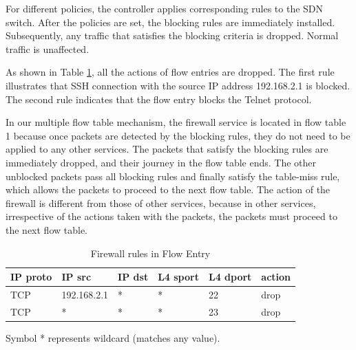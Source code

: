 For different policies, the controller applies corresponding rules to the SDN switch. After the policies are set, the blocking rules are immediately installed. Subsequently, any traffic that satisfies the blocking criteria is dropped. Normal traffic is unaffected.

As shown in Table \ref{table:fw}, all the actions of flow entries are dropped. The first rule illustrates that SSH connection with the source IP address 192.168.2.1 is blocked. The second rule indicates that the flow entry blocks the Telnet protocol.

In our multiple flow table mechanism, the firewall service is located in flow table 1 because once packets are detected by the blocking rules, they do not need to be applied to any other services. The packets that satisfy the blocking rules are immediately dropped, and their journey in the flow table ends. The other unblocked packets pass all blocking rules and finally satisfy the table-miss rule, which allows the packets to proceed to the next flow table. The action of the firewall is different from those of other services, because in other services, irrespective of the actions taken with the packets, the packets must proceed to the next flow table.

\begin{table}[!t]
\caption{Firewall rules in Flow Entry}
\label{table:fw}
\centering
\begin{threeparttable}
\begin{tabular}{|l|l|l|l|l|l|}
\hline
IP proto & IP src      & IP dst       & L4 sport & L4 dport & action \\ \hline
TCP      & 192.168.2.1 & *            & *        & 22       & drop   \\ \hline
TCP      & *           & *            & *        & 23       & drop   \\ \hline
\end{tabular}
  \begin{tablenotes}
    \item[] Symbol * represents wildcard (matches any value).
  \end{tablenotes}
\end{threeparttable}
\end{table}


